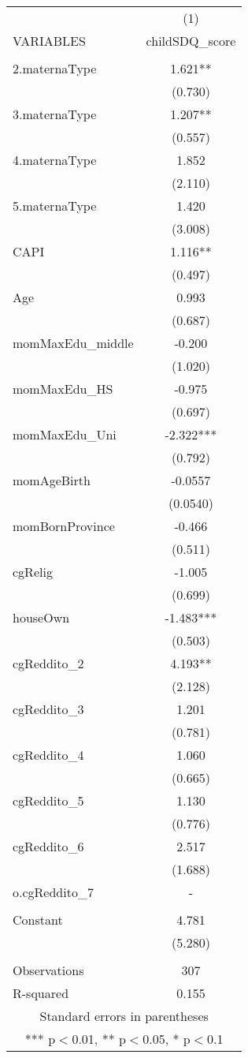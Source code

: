 \begin{tabular}{lc} \hline
 & (1) \\
VARIABLES & childSDQ\_score \\ \hline
 &  \\
2.maternaType & 1.621** \\
 & (0.730) \\
3.maternaType & 1.207** \\
 & (0.557) \\
4.maternaType & 1.852 \\
 & (2.110) \\
5.maternaType & 1.420 \\
 & (3.008) \\
CAPI & 1.116** \\
 & (0.497) \\
Age & 0.993 \\
 & (0.687) \\
momMaxEdu\_middle & -0.200 \\
 & (1.020) \\
momMaxEdu\_HS & -0.975 \\
 & (0.697) \\
momMaxEdu\_Uni & -2.322*** \\
 & (0.792) \\
momAgeBirth & -0.0557 \\
 & (0.0540) \\
momBornProvince & -0.466 \\
 & (0.511) \\
cgRelig & -1.005 \\
 & (0.699) \\
houseOwn & -1.483*** \\
 & (0.503) \\
cgReddito\_2 & 4.193** \\
 & (2.128) \\
cgReddito\_3 & 1.201 \\
 & (0.781) \\
cgReddito\_4 & 1.060 \\
 & (0.665) \\
cgReddito\_5 & 1.130 \\
 & (0.776) \\
cgReddito\_6 & 2.517 \\
 & (1.688) \\
o.cgReddito\_7 & - \\
 &  \\
Constant & 4.781 \\
 & (5.280) \\
 &  \\
Observations & 307 \\
 R-squared & 0.155 \\ \hline
\multicolumn{2}{c}{ Standard errors in parentheses} \\
\multicolumn{2}{c}{ *** p$<$0.01, ** p$<$0.05, * p$<$0.1} \\
\end{tabular}
